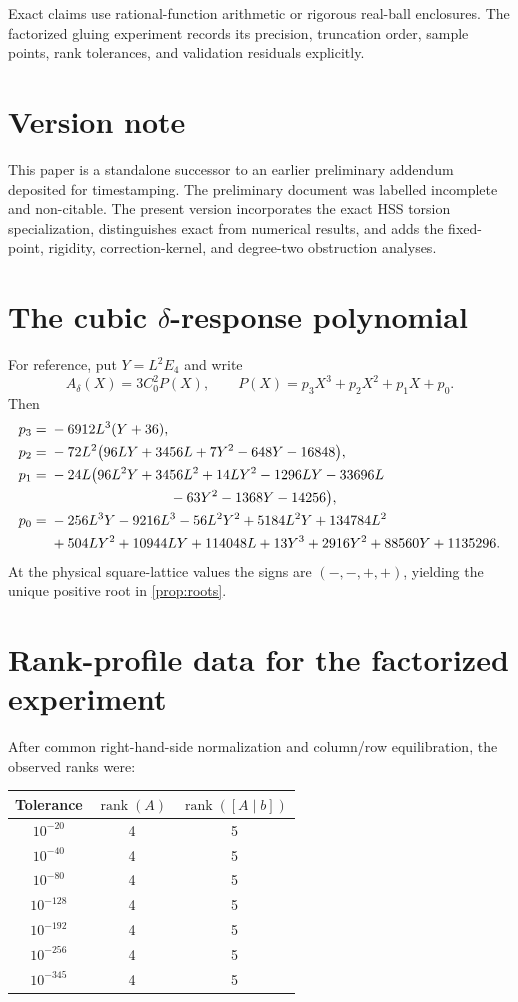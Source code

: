 \documentclass[11pt]{article}
\theoremstyle{definition}
\theoremstyle{remark}
\newcommand{\rank}{\operatorname{rank}}
\begin{document}
Exact claims use rational-function arithmetic or rigorous real-ball enclosures.  The factorized gluing experiment records its precision, truncation order, sample points, rank tolerances, and validation residuals explicitly.

\section*{Version note}

This paper is a standalone successor to an earlier preliminary addendum deposited for timestamping.  The preliminary document was labelled incomplete and non-citable.  The present version incorporates the exact HSS torsion specialization, distinguishes exact from numerical results, and adds the fixed-point, rigidity, correction-kernel, and degree-two obstruction analyses.

\appendix

\section{The cubic \texorpdfstring{$\delta$}{delta}-response polynomial}

For reference, put \(Y=L^2E_4\) and write
\[
 A_\delta(X)=3C_0^2P(X),
 \qquad
 P(X)=p_3X^3+p_2X^2+p_1X+p_0.
\]
Then
\begin{align*}
 p_3={}&-6912L^3(Y+36),\\
 p_2={}&-72L^2\bigl(96LY+3456L+7Y^2-648Y-16848\bigr),\\
 p_1={}&-24L\bigl(96L^2Y+3456L^2+14LY^2-1296LY-33696L\\
 &\hspace{30mm}-63Y^2-1368Y-14256\bigr),\\
 p_0={}&-256L^3Y-9216L^3-56L^2Y^2+5184L^2Y+134784L^2\\
 &+504LY^2+10944LY+114048L+13Y^3+2916Y^2+88560Y+1135296.
\end{align*}
At the physical square-lattice values the signs are \((-,-,+,+)\), yielding the unique positive root in \cref{prop:roots}.

\section{Rank-profile data for the factorized experiment}

After common right-hand-side normalization and column/row equilibration, the observed ranks were:

\begin{center}
\begin{tabular}{ccc}
\toprule
Tolerance & \(\rank(A)\) & \(\rank([A\mid b])\) \\
\midrule
\(10^{-20}\) & 4 & 5 \\
\(10^{-40}\) & 4 & 5 \\
\(10^{-80}\) & 4 & 5 \\
\(10^{-128}\) & 4 & 5 \\
\(10^{-192}\) & 4 & 5 \\
\(10^{-256}\) & 4 & 5 \\
\(10^{-345}\) & 4 & 5 \\
\bottomrule
\end{tabular}
\end{center}
\end{document}
